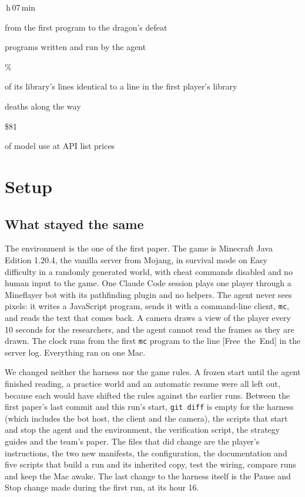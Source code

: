\documentclass[11pt,a4paper]{article}
\newcommand{\statcell}[2]{%
  \begin{minipage}[t]{0.177\textwidth}\raggedright
    {\sffamily\fontsize{17}{20}\selectfont #1\par}\vspace{3pt}
    {\sffamily\fontsize{7}{8.6}\selectfont\color{inkgrey}#2\par}
  \end{minipage}}
\newcommand{\statsep}{\hspace{0.5em}{\color{rulegrey}\vrule width 0.6pt}\hspace{0.6em}}
\newcommand{\adv}[1]{\mbox{\textsf{[#1]}}}
\begin{document}
\vspace{10pt}
\noindent\statcell{9\,h\,07\,min}{from the first program to the dragon's defeat}%
\statsep\statcell{780}{programs written and run by the agent}%
\statsep\statcell{81\%}{of its library's lines identical to a line in the first player's library}%
\statsep\statcell{16}{deaths along the way}%
\statsep\statcell{\$81}{of model use at API list prices}
\vspace{6pt}

\section{Setup}
\label{sec:setup}

\subsection{What stayed the same}

The environment is the one of the first paper. The game is Minecraft Java Edition 1.20.4, the vanilla server from Mojang, in survival mode on Easy difficulty in a randomly generated world, with cheat commands disabled and no human input to the game. One Claude Code session \citep{claudecode} plays one player through a Mineflayer bot \citep{mineflayer} with its pathfinding plugin and no helpers. The agent never sees pixels: it writes a JavaScript program, sends it with a command-line client, \texttt{mc}, and reads the text that comes back. A camera draws a view of the player every 10 seconds for the researchers, and the agent cannot read the frames as they are drawn. The clock runs from the first \texttt{mc} program to the line \adv{Free the End} in the server log. Everything ran on one Mac.

We changed neither the harness nor the game rules. A frozen start until the agent finished reading, a practice world and an automatic resume were all left out, because each would have shifted the rules against the earlier runs. Between the first paper's last commit and this run's start, \texttt{git diff} is empty for the harness (which includes the bot host, the client and the camera), the scripts that start and stop the agent and the environment, the verification script, the strategy guides and the team's paper. The files that did change are the player's instructions, the two new manifests, the configuration, the documentation and five scripts that build a run and its inherited copy, test the wiring, compare runs and keep the Mac awake. The last change to the harness itself is the Pause and Stop change made during the first run, at its hour 16.
\end{document}

